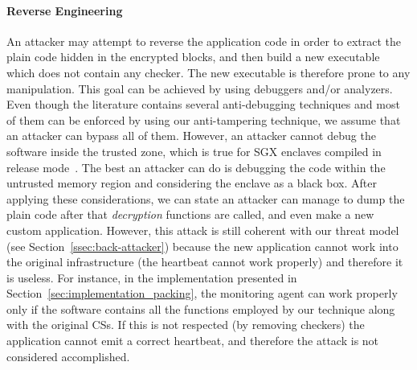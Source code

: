 \paragraph{\textbf{Reverse Engineering}}
An attacker may attempt to reverse the application code in order to extract the 
plain code hidden in the encrypted blocks, and then build a new executable 
which does not contain any checker.
The new executable is therefore prone to any manipulation.
This goal can be achieved by using debuggers and/or analyzers.
Even though the literature contains several anti-debugging techniques and most 
of them can be enforced by using our anti-tampering technique, we assume that 
an attacker can bypass all of them.
However, an attacker cannot debug the software inside the trusted zone, which 
is true for SGX enclaves compiled in release mode~\cite{sgxnodebug}.
The best an attacker can do is debugging the code within the untrusted memory 
region and considering the enclave as a black box.
After applying these considerations, we can state an attacker can manage to 
dump the plain code after that \emph{decryption} functions are called, and even 
make a new custom application.
However, this attack is still coherent with our threat model (see 
Section~\ref{ssec:back-attacker}) because the new application cannot work into 
the original infrastructure (\ie the heartbeat cannot work properly) and 
therefore it is useless.
For instance, in the implementation presented in 
Section~\ref{sec:implementation_packing}, 
the monitoring agent can work properly only if the software contains all the 
functions employed by our technique along with the original CSs.
If this is not respected  (\ie by removing checkers) the application cannot 
emit a correct heartbeat,
and therefore the attack is not considered accomplished.


